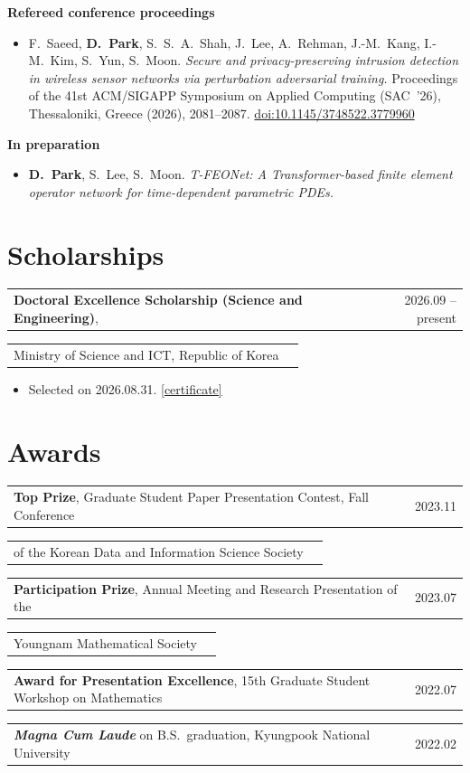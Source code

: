 \documentclass[11pt,a4paper]{article}
\makeatletter
\newcommand{\me}{\textbf{D.~Park}}
\newcommand{\entry}[2]{\noindent\begin{tabularx}{\textwidth}{@{}Xr@{}}#1 & #2\end{tabularx}\par}
\makeatother
\begin{document}
\vspace{0.5em}
\noindent\textbf{Refereed conference proceedings}
\begin{itemize}[leftmargin=2.2em, itemsep=0.5em, topsep=0.4em]
  \item[{[2]}] F.~Saeed, \me, S.~S.~A.~Shah, J.~Lee, A.~Rehman, J.-M.~Kang, I.-M.~Kim, S.~Yun, S.~Moon.
    \emph{Secure and privacy-preserving intrusion detection in wireless sensor networks via
    perturbation adversarial training.}
    Proceedings of the 41st ACM/SIGAPP Symposium on Applied Computing (SAC~'26),
    Thessaloniki, Greece (2026), 2081--2087.
    \href{https://doi.org/10.1145/3748522.3779960}{doi:10.1145/3748522.3779960}
\end{itemize}

\vspace{0.5em}
\noindent\textbf{In preparation}
\begin{itemize}[leftmargin=2.2em, itemsep=0.5em, topsep=0.4em]
  \item \me, S.~Lee, S.~Moon.
    \emph{T-FEONet: A Transformer-based finite element operator network for time-dependent parametric PDEs.}
\end{itemize}

\section{Scholarships}

\entry{\textbf{Doctoral Excellence Scholarship (Science and Engineering)},}{2026.09 -- present}
\entry{\hspace{1em}Ministry of Science and ICT, Republic of Korea}{}
\begin{itemize}[nosep]
  \item Selected on 2026.08.31.
    \href{https://github.com/Dabin-Park/Dabin-Park/blob/main/scholarships/2026-msit-doctoral/certificate.pdf}{[certificate]}
\end{itemize}

\section{Awards}

\entry{\textbf{Top Prize}, Graduate Student Paper Presentation Contest, Fall Conference}{2023.11}
\entry{\hspace{1em}of the Korean Data and Information Science Society}{}
\entry{\textbf{Participation Prize}, Annual Meeting and Research Presentation of the}{2023.07}
\entry{\hspace{1em}Youngnam Mathematical Society}{}
\entry{\textbf{Award for Presentation Excellence}, 15th Graduate Student Workshop on Mathematics}{2022.07}
\entry{\textit{\textbf{Magna Cum Laude}} on B.S.\ graduation, Kyungpook National University}{2022.02}
\end{document}
